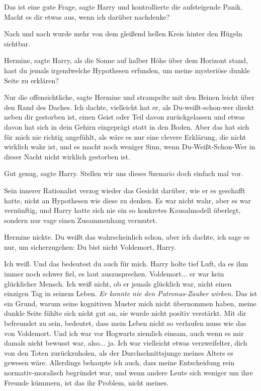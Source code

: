\glqq{}Das ist eine gute Frage\grqq{}, sagte Harry und kontrollierte die
aufsteigende Panik. \glqq{}Macht es dir etwas aus, wenn ich darüber nachdenke?\grqq{}

Nach und nach wurde mehr von dem gleißend hellen Kreis hinter den Hügeln
sichtbar.

\glqq{}Hermine\grqq{}, sagte Harry, als die Sonne auf halber Höhe über dem
Horizont stand, \glqq{}hast du jemals irgendwelche Hypothesen erfunden, um meine
mysteriöse dunkle Seite zu erklären?\grqq{}

\glqq{}Nur die offensichtliche\grqq{}, sagte Hermine und strampelte mit den
Beinen leicht über den Rand des Daches. \glqq{}Ich dachte, vielleicht hat er, als
Du-weißt-schon-wer direkt neben dir gestorben ist, einen Geist oder Teil davon
zurückgelassen und etwas davon hat sich in dein Gehirn eingeprägt statt in den
Boden. Aber das hat sich für mich nie richtig angefühlt, als wäre es nur eine
clevere Erklärung, die nicht wirklich wahr ist, und es macht noch weniger Sinn,
wenn Du-Weißt-Schon-Wer in dieser Nacht nicht wirklich gestorben ist.\grqq{}

\glqq{}Gut genug\grqq{}, sagte Harry. \glqq{}Stellen wir uns dieses Szenario doch
einfach mal vor.\grqq{}

Sein innerer Rationalist verzog wieder das Gesicht darüber, wie er es geschafft
hatte, nicht an Hypothesen wie diese zu denken. Es war nicht wahr, aber es war
vernünftig, und Harry hatte sich nie ein so konkretes Kausalmodell überlegt,
sondern nur vage einen Zusammenhang vermutet.

Hermine nickte. \glqq{}Du weißt das wahrscheinlich schon, aber ich dachte, ich
sage es nur, um sicherzugehen: Du bist nicht Voldemort, Harry.\grqq{}

\glqq{}Ich weiß. Und das bedeutest du auch für mich.\grqq{} Harry holte tief Luft, da
es ihm immer noch schwer fiel, es laut auszusprechen. \glqq{}Voldemort... er war
kein glücklicher Mensch. Ich weiß nicht, ob er jemals glücklich war, nicht einen
einzigen Tag in seinem Leben.\grqq{}
\emph{Er konnte nie den Patronus-Zauber wirken.}
\glqq{}Das ist ein Grund, warum seine kognitiven Muster mich nicht übernommen
haben, meine dunkle Seite fühlte sich nicht gut an, sie wurde nicht positiv
verstärkt. Mit dir befreundet zu sein, bedeutet, dass mein Leben nicht so
verlaufen muss wie das von Voldemort. Und ich war vor Hogwarts ziemlich einsam,
auch wenn es mir damals nicht bewusst war, also... ja. Ich war vielleicht etwas
verzweifelter, dich von den Toten zurückzuholen, als der Durchschnittsjunge
meines Alters es gewesen wäre. Allerdings behaupte ich auch, dass meine
Entscheidung rein normativ-moralisch begründet war, und wenn andere Leute sich
weniger um ihre Freunde kümmern, ist das ihr Problem, nicht meines.\grqq{}

